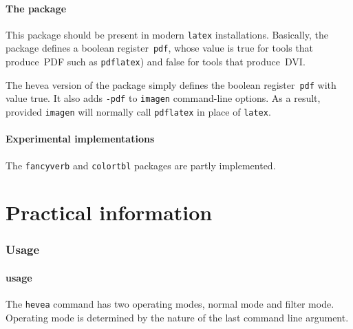 \subsection{The  package}
This package should be present in modern \texttt{latex} installations.
Basically, the package defines a boolean register~\texttt{pdf}, whose
value is true for tools that produce~\textsc{PDF} such as
\texttt{pdflatex}) and false for tools that produce~\textsc{DVI}.

The hevea version of the package simply defines the boolean
register~\texttt{pdf} with value true. It also adds
\texttt{-pdf}  to \texttt{imagen} command-line options.
As a result, provided \texttt{imagen} will normally call
\texttt{pdflatex} in place of \texttt{latex}.



\subsection{Experimental implementations}
The \texttt{fancyverb} and \texttt{colortbl}
packages are partly implemented.

\cutend
\setcounter{section}{0}

\part{Practical \label{practical}information}

\section{Usage}
\subsection{\hevea{} usage}\label{heveausage}
The \texttt{hevea} command has two operating modes, normal mode and
filter mode.
Operating mode is determined by the nature of the last command line
argument.

